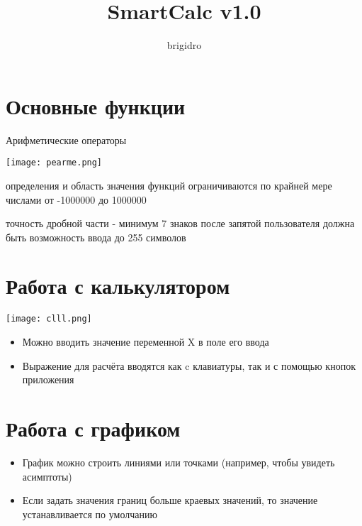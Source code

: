 \documentclass[a4paper,12pt]{article}
\author{brigidro}
\title{SmartCalc v1.0}
\begin{document}
	\maketitle
	\section{Основные функции}
		Арифметические операторы

\texttt{[image: pearme.png]}


	\begin{itemize}

 определения и область значения функций ограничиваются по крайней мере числами от -1000000 до 1000000

 точность дробной части - минимум 7 знаков после запятой
 пользователя должна быть возможность ввода до 255 символов
\end{itemize}

	\section{Работа с калькулятором}
	\texttt{[image: clll.png]}

		\begin{itemize}
\item Можно вводить значение переменной  X    в поле его ввода
\item Выражение для расчёта вводятся как c клавиатуры, так и с помощью кнопок приложения

	\end{itemize}

	\section{Работа с графиком}


	\begin{itemize}

		\item График можно строить линиями или точками (например, чтобы увидеть асимптоты)

		\item Если задать значения границ больше краевых значений, то значение устанавливается по умолчанию
	\end{itemize}
\end{document}
